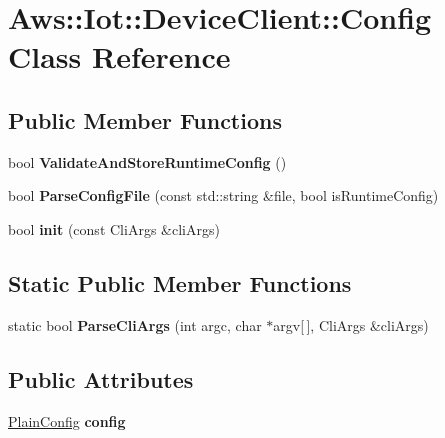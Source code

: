 \hypertarget{class_aws_1_1_iot_1_1_device_client_1_1_config}{}\section{Aws\+:\+:Iot\+:\+:Device\+Client\+:\+:Config Class Reference}
\label{class_aws_1_1_iot_1_1_device_client_1_1_config}
\subsection*{Public Member Functions}
\begin{DoxyCompactItemize}
\item 
\mbox{\label{class_aws_1_1_iot_1_1_device_client_1_1_config_a04650d1df3804ca66090372c000361cd}} 
bool {\bfseries Validate\+And\+Store\+Runtime\+Config} ()
\item 
\mbox{\label{class_aws_1_1_iot_1_1_device_client_1_1_config_aa98504ecb47adcb2b314b80c8f1126cf}} 
bool {\bfseries Parse\+Config\+File} (const std\+::string \&file, bool is\+Runtime\+Config)
\item 
\mbox{\label{class_aws_1_1_iot_1_1_device_client_1_1_config_a9cc6f1feb804069d5fc388064385834b}} 
bool {\bfseries init} (const Cli\+Args \&cli\+Args)
\end{DoxyCompactItemize}
\subsection*{Static Public Member Functions}
\begin{DoxyCompactItemize}
\item 
\mbox{\label{class_aws_1_1_iot_1_1_device_client_1_1_config_a79d6a0fcb2e082a507db7f0c610193eb}} 
static bool {\bfseries Parse\+Cli\+Args} (int argc, char $\ast$argv\mbox{[}$\,$\mbox{]}, Cli\+Args \&cli\+Args)
\end{DoxyCompactItemize}
\subsection*{Public Attributes}
\begin{DoxyCompactItemize}
\item 
\mbox{\label{class_aws_1_1_iot_1_1_device_client_1_1_config_a6eb01a26b458b7fcc4515f8a9c721516}} 
\hyperlink{struct_aws_1_1_iot_1_1_device_client_1_1_plain_config}{Plain\+Config} {\bfseries config}
\end{DoxyCompactItemize}
